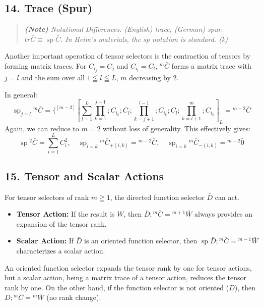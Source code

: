 \documentclass[11pt,a4paper,oneside]{article}
\DeclareMathOperator{\spn}{sp}
\newenvironment{fancyquote}
    {\begin{quote}\itshape\color{theoryblue!80!black}\guillemotleft\;}
    {\;\guillemotright\end{quote}}
\begin{document}
\subsection{14. Trace (Spur)}
\begin{fancyquote}
    \textbf{(Note)} Notational Differences: (English) trace, (German) spur. $tr \bar{C} \equiv \spn \bar{C}$. In Heim's materials, the sp notation is standard. (k)
\end{fancyquote}

Another important operation of tensor selectors is the contraction of tensors by forming matrix traces. For $C_{i_j} = C_j$ and $C_{i_l} = C_l$, ${}^m \bar {C}$ forms a matrix trace with $j = l$ and the sum over all $1 \leqq l \leqq L$, $m$ decreasing by 2.

In general:
\begin{equation*}
    \spn_{j = l} {}^m \bar {C} = \{^{[m-2]} [\sum_{l = 1}^L \prod_{k = 1}^{j-1}; C_{i_k}; C_l; \prod_{k = j + 1}^{l-1}; C_{i_k};C_l; \prod_{k = l + 1}^{m }; C_{i_k}]_L = {}^{m-2} \bar {C}
\end{equation*}
Again, we can reduce to $m = 2$ without loss of generality. This effectively gives:
\begin{equation}
    \spn {}^2 \bar{C} = \sum_{i = 1}^L C_i^2,\quad \spn_{i = k} {}^m \bar{C}_{+(i,k)} = {}^{m-2} \bar{C},\quad \spn_{i = k} {}^m \bar{C}_{-(i,k)} = {}^{m-2} \bar{0} \tag{M12a}
\end{equation}

\subsection{15. Tensor and Scalar Actions}
For tensor selectors of rank $m \geqq 1$, the directed function selector $\bar{D}$ can act.
\begin{itemize}
    \item \textbf{Tensor Action:} If the result is $W$, then $\bar{D};{}^m \bar{C} = {}^{m + 1} \bar{W}$ always provides an expansion of the tensor rank.
    \item \textbf{Scalar Action:} If $\bar{D}$ is an oriented function selector, then $\spn \bar{D};{}^m \bar{C} = {}^{m-1} \bar{W}$ characterizes a scalar action.
\end{itemize}
An oriented function selector expands the tensor rank by one for tensor actions, but a scalar action, being a matrix trace of a tensor action, reduces the tensor rank by one. On the other hand, if the function selector is not oriented ($D$), then $D;{}^m \bar{C} = {}^m \bar{W}$ (no rank change).
\end{document}
